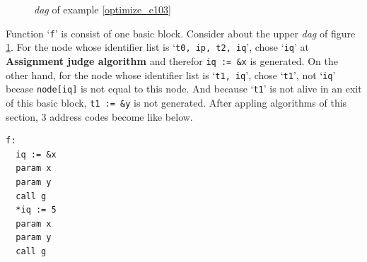 \begin{Example}
\begin{figure}[htbp]
\begin{center}
\begin{latexonly}
\end{latexonly}
\caption{{\em dag} of example \ref{optimize_e103}}
\label{optimize_e104}
\end{center}
\end{figure}
Function `{\tt{f}}' is consist of one basic block.
Consider about the upper {\em dag} of figure \ref{optimize_e104}.
For the node whose identifier list is `{\tt{t0, ip, t2, iq}}',
chose `{\tt{iq}}' at {\bf Assignment judge algorithm} and
therefor {\tt{iq := \&x}} is generated.
On the other hand, for the node whose identifier list
is `{\tt{t1, iq}}', chose `{\tt{t1}}', not `{\tt{iq}}'
becase {\tt{node[iq]}} is not equal to this node. 
And because `{\tt{t1}}' is not alive in an exit of this basic
block, {\tt{t1 := \&y}} is not generated.
After appling algorithms of this section,
3 address codes become like below.
\begin{verbatim}
f:
  iq := &x
  param x
  param y
  call g
  *iq := 5
  param x
  param y
  call g
\end{verbatim}
\end{Example}

